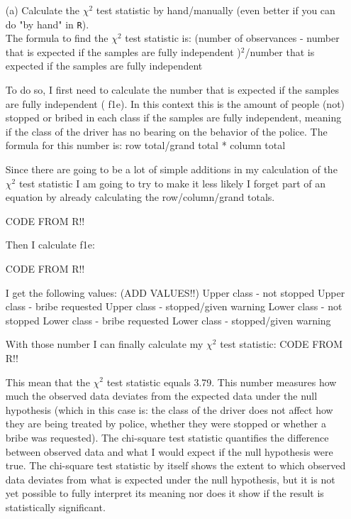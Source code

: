 \documentclass[12pt,letterpaper]{article}
\begin{document}
\begin{enumerate}
	
	\item [(a)]
	Calculate the $\chi^2$ test statistic by hand/manually (even better if you can do "by hand" in \texttt{R}).\\
	
	The formula to find the $\chi^2$ test statistic is:
	(number of observances - number that is expected if the samples are fully independent )$^2$/number that is expected if the samples are fully independent
	
	To do so, I first need to calculate the number that is expected if the samples are fully independent ( f1e). In this context this is the amount of people (not) stopped or bribed in each class if the samples are fully independent, meaning if the class of the driver has no bearing on the behavior of the police.
	The formula for this number is:
	row total/grand total * column total
	
	Since there are going to be a lot of simple additions in my calculation of the $\chi^2$ test statistic I am going to try to make it less likely I forget part of an equation by already calculating the row/column/grand totals. 
	
	CODE FROM R!!
	
	Then I calculate f1e:
	
		CODE FROM R!!
		
	I get the following values: (ADD VALUES!!)
	Upper class - not stopped
	Upper class - bribe requested
	Upper class - stopped/given warning 
	Lower class - not stopped
	Lower class - bribe requested
	Lower class - stopped/given warning 
	
	With those number I can finally calculate my $\chi^2$ test statistic:
	CODE FROM R!!
	
	This mean that the $\chi^2$ test statistic equals 3.79. This number measures how much the observed data deviates from the expected data under the null hypothesis (which in this case is: the class of the driver does not affect how they are being treated by police, whether they were stopped or whether a bribe was requested). The chi-square test statistic quantifies the difference between observed data and what I would expect if the null hypothesis were true. The chi-square test statistic by itself shows the extent to which observed data deviates from what is expected under the null hypothesis, but it is not yet possible to fully interpret its meaning nor does it show if the result is statistically significant.
	

\end{enumerate}
\end{document}
